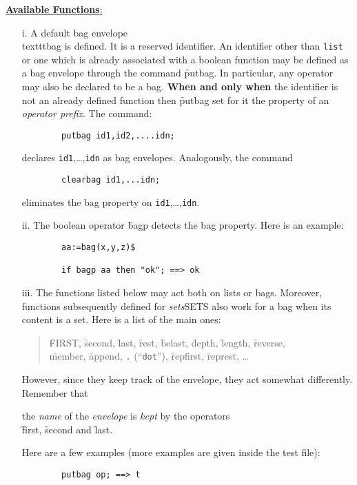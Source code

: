 \underline{\textbf{Available Functions}:}

\begin{itemize}
\item[i.] A default bag envelope \\texttt{bag} is defined.
\hypertarget{reserved:BAG}{}
It is a reserved identifier.
\hypertarget{operator:PUTBAG}{}
\hypertarget{operator:CLEARBAG}{}
\hypertarget{operator:BAGP}{}
An identifier other than \texttt{list} or one which is already associated
with a boolean function may be defined as a bag envelope through the
command \f{putbag}. In particular, any operator may also be declared
to be a bag. \textbf{When and only when} the identifier is not an already defined
function then \f{putbag} set for it the property of an \emph{operator prefix}.
The command:
\begin{verbatim}
        putbag id1,id2,....idn;
\end{verbatim}
declares \texttt{id1},\ldots,\texttt{idn} as bag envelopes.
Analogously, the command
\begin{verbatim}
        clearbag id1,...idn;
\end{verbatim}
eliminates the bag property on \texttt{id1},\ldots,\texttt{idn}.
\item[ii.] The boolean operator \f{bagp} detects the bag property.
Here is an example:
\begin{verbatim}
        aa:=bag(x,y,z)$

        if bagp aa then "ok"; ==> ok
\end{verbatim}
\item[iii.] The functions listed below may act both on lists or bags.
Moreover, functions subsequently  defined for  \emph{sets}SETS also work for a bag
when its content is a set.
Here is a list of the main ones:

\begin{quote}
\f{FIRST}, \f{second}, \f{last}, \f{rest}, \f{belast}, \f{depth}, \f{length}, \f{reverse},\\
\f{member}, \f{append}, \texttt{.} (``\texttt{dot}''), \f{repfirst}, \f{represt}, \ldots
\end{quote}

However, since they keep track of the envelope, they act
somewhat differently. Remember that   
\vspace{5pt}
\begin{center}
the \emph{name} of the \emph{envelope} is \emph{kept} by the operators \\[3pt]
\f{first}, \f{second} and \f{last}.
\end{center}
Here are a few examples (more examples are
given inside the test file):
\begin{verbatim}
        putbag op; ==> t


\end{verbatim}
\end{itemize}
